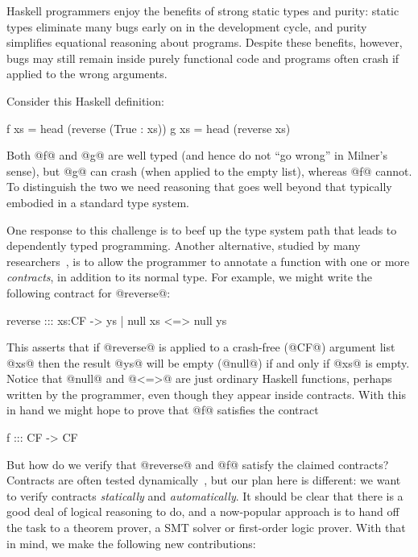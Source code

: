 Haskell programmers enjoy the benefits of strong static types and purity: 
static types eliminate many bugs early on in the development cycle, and purity 
simplifies equational reasoning about programs. Despite these benefits, however, 
bugs may still remain inside purely functional code and programs often
crash if applied to the wrong arguments. 

Consider this Haskell definition:
\begin{code}
  f xs = head (reverse (True : xs))
  g xs = head (reverse xs)
\end{code}
Both @f@ and @g@ are well typed (and hence do not ``go wrong'' in Milner's 
sense), but @g@ can crash (when applied to the empty list), whereas @f@ cannot.
To distinguish the two we need reasoning that goes well beyond 
that typically embodied in a standard type system.

One response to this challenge is to beef up the type system
path that leads to dependently typed programming.  Another alternative,
studied by many researchers~\cite{contracts-literature}, is to allow 
the programmer to annotate a function with one or more
\emph{contracts}, in addition to its normal type.
For example, we might write the following contract for @reverse@:
\begin{code}
  reverse ::: xs:CF -> { ys | null xs <=> null ys }
\end{code}
This asserts that if @reverse@ is applied to a crash-free (@CF@) argument list @xs@
then the result @ys@ will be empty (@null@) if and only if @xs@ is empty.
Notice that @null@ and @<=>@ are just ordinary Haskell functions, perhaps
written by the programmer, even though they appear inside contracts.
With this in hand we might hope to prove that @f@ satisfies the contract
\begin{code}
  f ::: CF -> CF
\end{code}
But how do we verify that @reverse@ and @f@ satisfy the claimed
contracts? Contracts are often tested dynamically~\cite{finder-felliesen}, but 
our plan here is different: we want to verify contracts \emph{statically} 
and \emph{automatically}. It should be clear that there is a good deal of logical reasoning to do,
and a now-popular approach is to hand off the task to a theorem
prover, a SMT solver or first-order logic prover.
With that in mind, we make the following new contributions:

